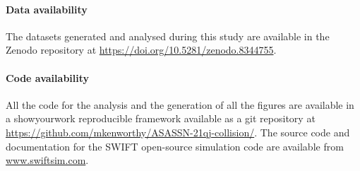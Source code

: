 \documentclass[sn-nature,oneside]{sn-jnl}%
\begin{document}








\paragraph{Data availability}
The datasets generated and analysed during this study are available in the Zenodo repository at \url{https://doi.org/10.5281/zenodo.8344755}.

\paragraph{Code availability} 
All the code for the analysis and the generation of all the figures  are available in a showyourwork \citep{Luger2021} reproducible framework available as a git repository at \url{https://github.com/mkenworthy/ASASSN-21qj-collision/}.
%
The source code and documentation for the SWIFT open-source simulation code are available from \url{www.swiftsim.com}.
\end{document}
